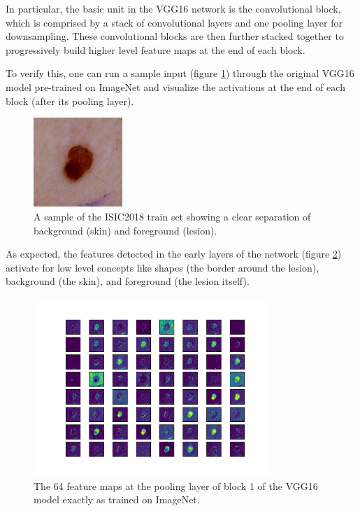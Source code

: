 In particular, the basic unit in the VGG16 network is the convolutional block, which is comprised by a stack of convolutional layers and one pooling layer for downsampling. These convolutional blocks are then further stacked together to progressively build higher level feature maps at the end of each block.

To verify this, one can run a sample input (figure \ref{fig:sample_input}) through the original VGG16 model pre-trained on ImageNet and visualize the activations at the end of each block (after its pooling layer).

\begin{figure}
    \centering
    \includegraphics[width=0.3\textwidth]{figs/sample_input.jpg}
    \caption{A sample of the ISIC2018 train set showing a clear separation of background (skin) and foreground (lesion).}
    \label{fig:sample_input}
\end{figure}

As expected, the features detected in the early layers of the network (figure \ref{fig:vgg16_block1}) activate for low level concepts like shapes (the border around the lesion), background (the skin), and foreground (the lesion itself).

\begin{figure}
    \centering
    \includegraphics[width=0.8\textwidth]{figs/vgg16_block1.png}
    \caption{The 64 feature maps at the pooling layer of block 1 of the VGG16 model exactly as trained on ImageNet.}
    \label{fig:vgg16_block1}
\end{figure}

